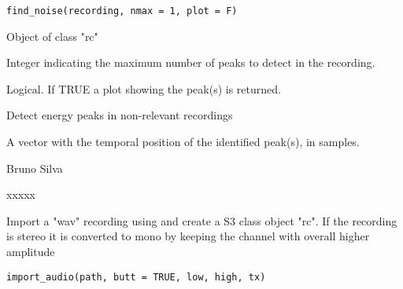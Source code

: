 \documentclass[letterpaper]{book}
\begin{document}
%
\begin{Usage}
\begin{verbatim}
find_noise(recording, nmax = 1, plot = F)
\end{verbatim}
\end{Usage}
%
\begin{Arguments}
\begin{ldescription}
\item[\code{recording}] Object of class "rc"

\item[\code{nmax}] Integer indicating the maximum number of peaks to detect in
the recording.

\item[\code{plot}] Logical. If TRUE a plot showing the peak(s) is returned.
\end{ldescription}
\end{Arguments}
%
\begin{Details}\relax
Detect energy peaks in non-relevant recordings
\end{Details}
%
\begin{Value}
A vector with the temporal position of the
identified peak(s), in samples.
\end{Value}
%
\begin{Author}\relax
Bruno Silva
\end{Author}
%
\begin{Examples}
\begin{ExampleCode}
xxxxx
\end{ExampleCode}
\end{Examples}
%
\begin{Description}\relax
Import a "wav" recording using 
and create a S3 class object "rc". If the recording is stereo it is converted
to mono by keeping the channel with overall higher amplitude
\end{Description}
%
\begin{Usage}
\begin{verbatim}
import_audio(path, butt = TRUE, low, high, tx)
\end{verbatim}
\end{Usage}
%
\end{document}
